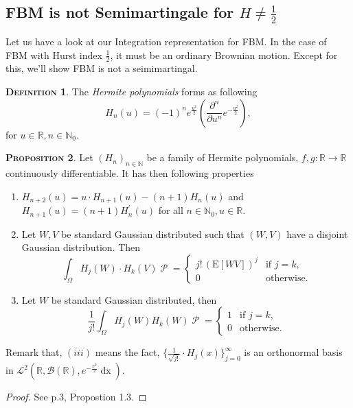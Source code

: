 \documentclass[a4paper, twoside, 11pt]{article}
\theoremstyle{definition}
\newtheorem{definition}{\scshape Definition}[section]
\newtheorem{proposition}[definition]{\scshape Proposition}
\begin{document}
\subsection{FBM is not Semimartingale for $H\neq \frac{1}{2}$}
Let us have a look at our Integration representation for FBM. In the case of FBM with Hurst index $\frac{1}{2}$, it must be an ordinary Brownian motion. Except for this, we'll show FBM is not a seimimartingal.

\begin{definition}
  The \emph{Hermite polynomials} forms as following
  \begin{equation}
	H_n(u) = (-1)^n e^{\frac{u^2}{2}} (\frac{\partial^n }{\partial u^n}e^{-\frac{u^2}{2}}),
	\label{sec:hermite}
  \end{equation}
  for $u\in \mathbb{R}, n\in \mathbb{N}_0$. 
\end{definition}
\begin{proposition}
  Let $(H_n)_{n\in \mathbb{N}}$ be a family of Hermite polynomials, $f, g: \mathbb{R}\rightarrow \mathbb{R}$ continuously differentiable. It has then following properties 
  \begin{enumerate}[topsep=0pt, itemsep=-1ex, partopsep=1ex, parsep=1ex, label=(\roman*)]
	\item  $H_{n+2}(u)=u\cdot H_{n+1}(u) - (n+1)H_n(u)$  and $H_{n+1}(u)= (n+1)H^{'}_n(u)$ for all $n\in\mathbb{N}_0, u\in\mathbb{R}$.
	\item Let $W, V$ be standard Gaussian distributed such that $(W, V)$ have a disjoint Gaussian distribution. Then
	  \begin{equation*}
		\int_{\Omega} H_j(W)\cdot H_k(V) \mathop{\mathcal{P}} = \begin{cases} j!\,(\mathrm{E}[WV])^j & \mbox{if } j=k,\\
		  0 &\text{otherwise}.
		\end{cases}
	  \end{equation*}
	\item Let $W$ be standard Gaussian distributed, then
	  \begin{equation*}
		\frac{1}{j!} \int_\Omega H_j(W) H_k(W) \mathop{\mathcal{P}} = \begin{cases} 1 & \mbox{if } j=k,\\
		  0 & \text{otherwise}.
		\end{cases}
	  \end{equation*}
\end{enumerate}
Remark that, $(iii)$ means the fact, $\{\frac{1}{\sqrt{j!}}\cdot H_j(x)\}_{j=0}^{\infty}$ is an orthonormal basis in $\mathcal{L}^2(\mathbb{R}, \mathscr{B}(\mathbb{R}), e^{-\frac{x^2}{2}}\mathop{dx})$.
		\label{sec:herpro}
\end{proposition}
\begin{proof}
  See \cite{nourdin} p.3, Propostion 1.3.
\end{proof}
\end{document}
